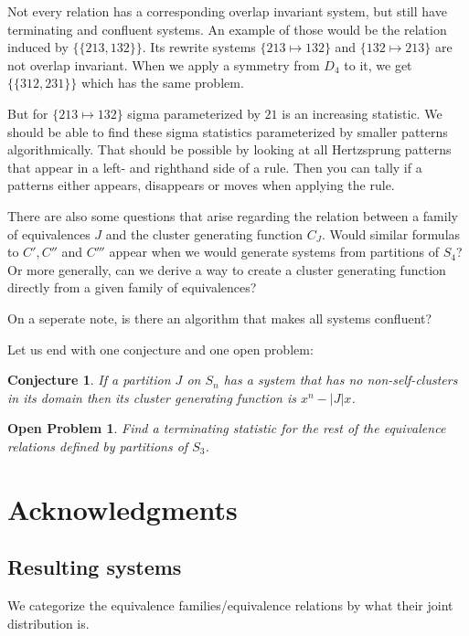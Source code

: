 \documentclass[a4paper, 11pt, english]{article}
\newcommand{\patternrule}{ \mapsto \!}
\newtheorem{openproblem}[theorem]{Open Problem}
\newtheorem{conjecture}[theorem]{Conjecture}
\theoremstyle{definition}
\newcommand{\Sym}{S}
\begin{document}
Not every relation has a corresponding overlap invariant system, but still have terminating and
confluent systems. An example of those would be the relation induced by $\{ \{ 213, 132
\} \}$. Its rewrite systems ${\{ 213 \patternrule 132 \}}$ and ${\{
132 \patternrule 213 \}}$ are not overlap invariant. When we
apply a symmetry from $D_4$ to it, we get $\{ \{ 312, 231 \} \}$ which has the same
problem.

But for $\{ 213 \patternrule 132 \}$ sigma parameterized by $21$ is an increasing statistic. We
should be able to find these sigma statistics parameterized by smaller patterns algorithmically.
That should be possible by looking at all Hertzsprung patterns that appear in a left- and righthand
side of a rule. Then you can tally if a patterns either appears, disappears or moves when applying the rule.

There are also some questions that arise regarding the relation between a family of equivalences $J$ and
the cluster generating function $C_J$.
Would similar formulas to $C', C''$ and $C'''$ appear when we would
generate systems from partitions of $\Sym_4$? 
Or more generally, 
can we derive a way to create a cluster generating function directly from a
given family of equivalences? 

On a seperate note,
is there an algorithm that makes all systems confluent?

Let us end with one conjecture and one open problem:
\begin{conjecture}
    If a partition $J$ on $\Sym_n$ has a system that has no non-self-clusters in
    its domain then its cluster generating function is $x^n-|J|x$.
\end{conjecture}

\begin{openproblem}
    Find a terminating statistic for the rest of the equivalence relations
    defined by partitions of $\Sym_3$.
\end{openproblem}

\section*{Acknowledgments}




\clearpage

\begin{appendices}

\clearpage

\section{Resulting systems}
We categorize the equivalence families/equivalence relations by what their joint
distribution is.
\begin{multicols}{2}

\end{multicols}
\end{appendices}
\end{document}
